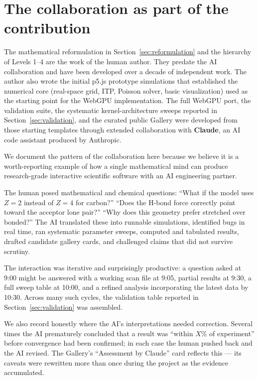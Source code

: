 \documentclass[11pt]{article}
\begin{document}
\section{The collaboration as part of the contribution}\label{sec:collaboration}

The mathematical reformulation in Section~\ref{sec:reformulation} and the hierarchy of Levels 1--4 are the work of the human author. They predate the AI collaboration and have been developed over a decade of independent work. The author also wrote the initial p5.js prototype simulations that established the numerical core (real-space grid, ITP, Poisson solver, basic visualization) used as the starting point for the WebGPU implementation. The full WebGPU port, the validation suite, the systematic kernel-architecture sweeps reported in Section~\ref{sec:validation}, and the curated public Gallery were developed from those starting templates through extended collaboration with \textbf{Claude}, an AI code assistant produced by Anthropic.

We document the pattern of the collaboration here because we believe it is a worth-reporting example of how a single mathematical mind can produce research-grade interactive scientific software with an AI engineering partner.

The human posed mathematical and chemical questions: ``What if the model uses $Z=2$ instead of $Z=4$ for carbon?'' ``Does the H-bond force correctly point toward the acceptor lone pair?'' ``Why does this geometry prefer stretched over bonded?'' The AI translated these into runnable simulations, identified bugs in real time, ran systematic parameter sweeps, computed and tabulated results, drafted candidate gallery cards, and challenged claims that did not survive scrutiny.

The interaction was iterative and surprisingly productive: a question asked at 9:00 might be answered with a working scan file at 9:05, partial results at 9:30, a full sweep table at 10:00, and a refined analysis incorporating the latest data by 10:30. Across many such cycles, the validation table reported in Section~\ref{sec:validation} was assembled.

We also record honestly where the AI's interpretations needed correction. Several times the AI prematurely concluded that a result was ``within $X\%$ of experiment'' before convergence had been confirmed; in each case the human pushed back and the AI revised. The Gallery's ``Assessment by Claude'' card reflects this --- its caveats were rewritten more than once during the project as the evidence accumulated.
\end{document}
